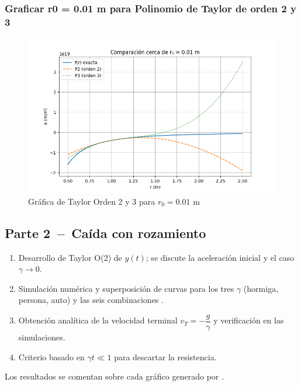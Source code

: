 \documentclass{article}
\begin{document}
\subsubsection{Graficar r0 = 0.01 m para Polinomio de Taylor de orden 2 y 3}

\begin{figure}[H]
    \centering
    \includegraphics[width=1\textwidth]{assets/taylor_orden2y3.png}
    \caption{Gráfica de Taylor Orden 2 y 3 para $r_0 = 0.01$ m}
\end{figure}



\subsection*{Parte 2 – Caída con rozamiento}
\begin{enumerate}
\item Desarrollo de Taylor O(2) de $y(t)$; se discute la aceleración
inicial y el caso $\gamma\to0$.
\item Simulación numérica y superposición de curvas para los tres $\gamma$
(hormiga, persona, auto) y las seis combinaciones .
\item Obtención analítica de la velocidad terminal
$v_T=-\dfrac{g}{\gamma}$ y verificación en las simulaciones.
\item Criterio basado en $\gamma t\ll1$ para descartar la resistencia.
\end{enumerate}
Los resultados se comentan sobre cada gráfico generado por
.

\end{document}
